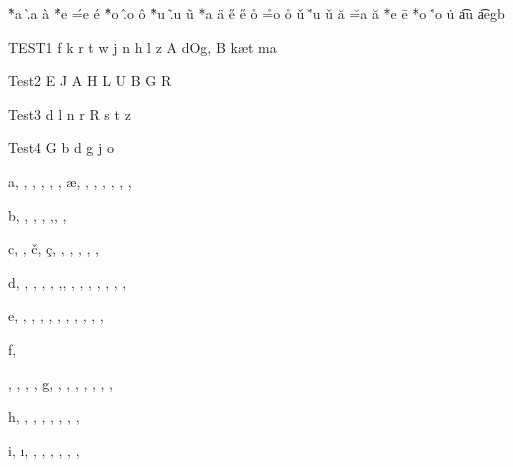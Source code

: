 \documentclass{article}
\begin{document}
\`*a  \`.a   \`a
\'*e  \'=e  \'e
\^*o  \^.o  \^o 
\~*u  \~.u  \~u 
\"*a  \"a 
\H*e  \H e 
\r*o  \r=o  \r o 
\v*u  \v'u  \v u 
\u*a   \u=a  \u a 
\=*e  \=e
\.*o  \.'o   \.u 
\t*au \t ae\texttoptiebar gb

\makeatletter
\def\textipa#1{{\let\*=\tipa@star\let\;=\tipa@semi\let\:=\tipa@colon
\let\!=\tipa@exclam#1}}
\makeatother

TEST1 \textipa{\*f \*k \*r \*t \*w}
\textipa{\*j \*n \*h \*l \*z}
\textipa{\*A dOg, \*B k\ae{}t ma\super{\*{214}}}
\par Test2 \textipa{\;E \;J \;A \;H \;L \;U \;B \;G \;R}
\par Test3 \textipa{\:d \:l \:n \:r \:R \:s \:t \:z}
\par Test4 \textipa{\!G \!b \!d \!g \!j \!o}


a, \textrhooka, \textturna, \textscripta, \textturnscripta,
\textinvscripta, \ae, \textaolig, \textsca, \textlhookfour, 
\textinvsca, \textscaolig, 
\textturnv, \textscdelta

b, \textcrb, \textbarb, \textsoftsign, \texthardsign,\texthtb, \textscb, \textbeta

c, \textbarc, \v{c}, \c{c}, \texthtc, \textctc, \textstretchc,
\textstretchcvar, \textctstretchc, \textctstretchcvar 

d, \textcrd, \textbard, \textfrhookd, \textfrhookdvar, \texthtd,\textrtaild,
\texthtrtaild, \textctd, \textdblig, \textdzlig,  \textdctzlig, 
\textdyoghlig, \textctdctzlig, \dh

e, \textrhooke, \textschwa, \textrhookschwa, \textreve, \textsce,
\textepsilon, \textrhookepsilon, \textcloseepsilon, \textrevepsilon,
\textrhookrevepsilon, \textcloserevepsilon

f, \textscf

\textscriptg,  \textbarg,  \textcrg, \texthtg, g, \textscg, \texthtscg,
\textgamma, \textgrgamma, \textfrtailgamma, \textbktailgamma,
\textbabygamma, \textramshorns

h, \texthvlig, \textcrh , \texthth, \textrtailhth, \textheng, \texththeng,
\textturnh, \textsch

i, \i, \textbari, \textsci, \textiota, \textlhti, \textlhtlongi,
\textvibyi, \textraisevibyi
\end{document}
